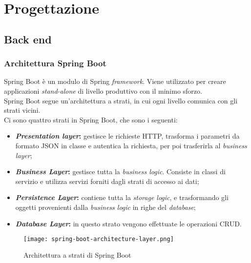 \section{Progettazione}
\label{sec:progettazione}

\subsection{Back end}
\subsubsection{Architettura Spring Boot}
Spring Boot è un modulo di Spring \textit{framework}. Viene utilizzato per creare applicazioni \textit{stand-alone} di livello produttivo con il minimo sforzo.\\
Spring Boot segue un'architettura a strati, in cui ogni livello comunica con gli strati vicini.\\
Ci sono quattro strati in Spring Boot, che sono i seguenti:
\begin{itemize}
    \item \textbf{\textit{Presentation layer}:} gestisce le richieste HTTP, trasforma i parametri da formato JSON in classe e autentica la richiesta, per poi trasferirla al \textit{business layer};
    \item \textbf{\textit{Business Layer}:} gestisce tutta la \textit{business logic}. Consiste in classi di servizio e utilizza servizi forniti dagli strati di accesso ai dati;
    \item \textbf{\textit{Persistence Layer}:} contiene tutta la \textit{storage logic}, e trasformando gli oggetti provenienti dalla \textit{business logic} in righe del \textit{database};
    \item \textbf{\textit{Database Layer}:} in questo strato vengono effettuate le operazioni \gls{CRUD}.
\end{itemize}
\begin{figure}[H] 
    \centering 
    \texttt{[image: spring-boot-architecture-layer.png]} 
    \caption{Architettura a strati di Spring Boot}
\end{figure}

